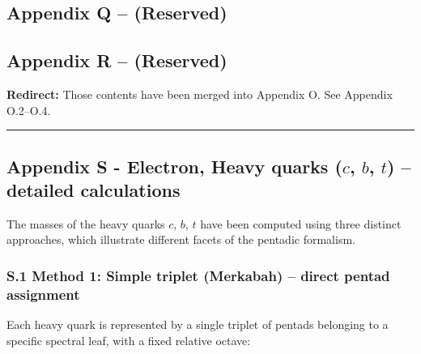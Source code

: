 \documentclass[11pt]{article}
\begin{document}
\hypertarget{appendix-q-reserved}{%
\subsection{Appendix Q -- (Reserved)}\label{appendix-q-reserved}}

\hypertarget{appendix-r-reserved}{%
\subsection{Appendix R -- (Reserved)}\label{appendix-r-reserved}}

\textbf{Redirect:} Those contents have been merged into Appendix O. See
Appendix O.2--O.4.

\begin{center}\rule{0.5\linewidth}{0.5pt}\end{center}

\hypertarget{appendix-s---electron-heavy-quarks-c-b-t-detailed-calculations}{%
\subsection{\texorpdfstring{Appendix S - Electron, Heavy quarks (\(c\),
\(b\), \(t\)) -- detailed
calculations}{Appendix S - Electron, Heavy quarks (c, b, t) -- detailed calculations}}\label{appendix-s---electron-heavy-quarks-c-b-t-detailed-calculations}}

The masses of the heavy quarks \(c\), \(b\), \(t\) have been computed
using three distinct approaches, which illustrate different facets of
the pentadic formalism.

\hypertarget{s.1-method-1-simple-triplet-merkabah-direct-pentad-assignment}{%
\subsubsection{S.1 Method 1: Simple triplet (Merkabah) -- direct pentad
assignment}\label{s.1-method-1-simple-triplet-merkabah-direct-pentad-assignment}}

Each heavy quark is represented by a single triplet of pentads belonging
to a specific spectral leaf, with a fixed relative octave:
\end{document}
